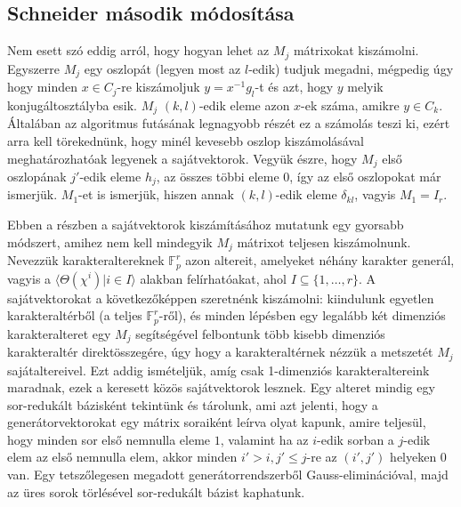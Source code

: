 \subsection{Schneider második módosítása}
\label{subsec:bdssch2}
Nem esett szó eddig arról, hogy hogyan lehet az $M_j$ mátrixokat kiszámolni.
Egyszerre $M_j$ egy oszlopát (legyen most az $l$-edik) tudjuk megadni, mégpedig úgy hogy minden $x \in C_j$-re kiszámoljuk
$y=x^{-1}g_l$-t és azt, hogy $y$ melyik konjugáltosztályba esik.
$M_j$ $(k,l)$-edik eleme azon $x$-ek száma, amikre $y\in C_k$.
Általában az algoritmus futásának legnagyobb részét ez a számolás teszi ki, ezért arra kell törekednünk, hogy minél kevesebb oszlop kiszámolásával meghatározhatóak legyenek a sajátvektorok.
Vegyük észre, hogy $M_j$ első oszlopának $j'$-edik eleme $h_j$, az összes többi eleme $0$, így az első oszlopokat már ismerjük.
$M_1$-et is ismerjük, hiszen annak $(k,l)$-edik eleme $\delta_{kl}$, vagyis $M_1=I_r$.

Ebben a részben a sajátvektorok kiszámításához mutatunk egy gyorsabb módszert, amihez nem kell mindegyik $M_j$ mátrixot teljesen kiszámolnunk.
Nevezzük karakteraltereknek $\mathbb{F}_p^r$ azon altereit, amelyeket néhány karakter generál, vagyis a $\langle \Theta(\chi^i) | i \in I \rangle$ alakban felírhatóakat, ahol $I \subseteq \{1,\dots,r\}$.
A sajátvektorokat a következőképpen szeretnénk kiszámolni:
kiindulunk egyetlen karakteraltérből (a teljes $\mathbb{F}_p^r$-ről), és minden lépésben egy legalább két dimenziós karakteralteret egy $M_j$ segítségével felbontunk több kisebb dimenziós karakteraltér direktösszegére,
úgy hogy a karakteraltérnek nézzük a metszetét $M_j$ sajátaltereivel.
Ezt addig ismételjük, amíg csak 1-dimenziós karakteraltereink maradnak, ezek a keresett közös sajátvektorok lesznek.
Egy alteret mindig egy sor-redukált bázisként tekintünk és tárolunk, ami azt jelenti, hogy a generátorvektorokat egy mátrix soraiként leírva olyat kapunk,
amire teljesül, hogy minden sor első nemnulla eleme $1$, valamint ha az $i$-edik sorban a $j$-edik elem az első nemnulla elem, akkor minden $i' > i, j'\le j$-re az $(i',j')$ helyeken 0 van.
Egy tetszőlegesen megadott generátorrendszerből Gauss-eliminációval, majd az üres sorok törlésével sor-redukált bázist kaphatunk.

